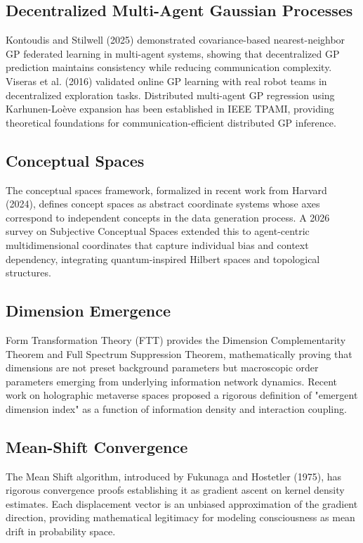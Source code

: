 \documentclass[11pt]{article}
\begin{document}
\subsection{Decentralized Multi-Agent Gaussian Processes}

Kontoudis and Stilwell (2025) demonstrated covariance-based nearest-neighbor GP federated learning in multi-agent systems, showing that decentralized GP prediction maintains consistency while reducing communication complexity. Viseras et al. (2016) validated online GP learning with real robot teams in decentralized exploration tasks. Distributed multi-agent GP regression using Karhunen-Lo\`eve expansion has been established in IEEE TPAMI, providing theoretical foundations for communication-efficient distributed GP inference.

\subsection{Conceptual Spaces}

The conceptual spaces framework, formalized in recent work from Harvard (2024), defines concept spaces as abstract coordinate systems whose axes correspond to independent concepts in the data generation process. A 2026 survey on Subjective Conceptual Spaces extended this to agent-centric multidimensional coordinates that capture individual bias and context dependency, integrating quantum-inspired Hilbert spaces and topological structures.

\subsection{Dimension Emergence}

Form Transformation Theory (FTT) provides the Dimension Complementarity Theorem and Full Spectrum Suppression Theorem, mathematically proving that dimensions are not preset background parameters but macroscopic order parameters emerging from underlying information network dynamics. Recent work on holographic metaverse spaces proposed a rigorous definition of "emergent dimension index" as a function of information density and interaction coupling.

\subsection{Mean-Shift Convergence}

The Mean Shift algorithm, introduced by Fukunaga and Hostetler (1975), has rigorous convergence proofs establishing it as gradient ascent on kernel density estimates. Each displacement vector is an unbiased approximation of the gradient direction, providing mathematical legitimacy for modeling consciousness as mean drift in probability space.
\end{document}
